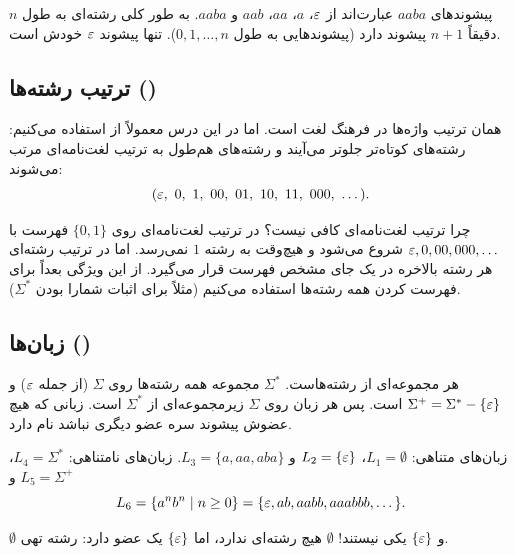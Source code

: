 \begin{example}
پیشوندهای $aaba$ عبارت‌اند از $\varepsilon$، $a$، $aa$، $aab$ و $aaba$. به طور کلی رشته‌ای به طول $n$ دقیقاً $n+1$ پیشوند دارد (پیشوندهایی به طول $0,1,\dots,n$). تنها پیشوند $\varepsilon$ خودش است.
\end{example}

\subsection{ترتیب رشته‌ها ()}
 همان ترتیب واژه‌ها در فرهنگ لغت است. اما در این درس معمولاً از  استفاده می‌کنیم: رشته‌های کوتاه‌تر جلوتر می‌آیند و رشته‌های هم‌طول به ترتیب لغت‌نامه‌ای مرتب می‌شوند:
\[(\eps,\ 0,\ 1,\ 00,\ 01,\ 10,\ 11,\ 000,\ \dots).\]

\begin{note}
چرا ترتیب لغت‌نامه‌ای کافی نیست؟ در ترتیب لغت‌نامه‌ای روی $\{0,1\}$ فهرست با $\varepsilon,0,00,000,\dots$ شروع می‌شود و هیچ‌وقت به رشته $1$ نمی‌رسد. اما در ترتیب رشته‌ای هر رشته بالاخره در یک جای مشخص فهرست قرار می‌گیرد. از این ویژگی بعداً برای فهرست کردن همه رشته‌ها استفاده می‌کنیم (مثلاً برای اثبات شمارا بودن $\Sigma^*$).
\end{note}

\subsection{زبان‌ها ()}

\begin{definition}[زبان]
 هر مجموعه‌ای از رشته‌هاست. $\Sigma^*$ مجموعه همه رشته‌ها روی $\Sigma$ (از جمله $\varepsilon$) و $\Sigma^+=\Sigma^*-\{\varepsilon\}$ است. پس هر زبان روی $\Sigma$ زیرمجموعه‌ای از $\Sigma^*$ است. زبانی که هیچ عضوش پیشوند سره عضو دیگری نباشد  نام دارد.
\end{definition}

\begin{example}
زبان‌های متناهی: $L_1=\emptyset$، $L_2=\{\varepsilon\}$ و $L_3=\{a,aa,aba\}$. زبان‌های نامتناهی: $L_4=\Sigma^*$، $L_5=\Sigma^+$ و
\[L_6=\{a^nb^n\mid n\ge0\}=\{\varepsilon,ab,aabb,aaabbb,\dots\}.\]
\end{example}

\begin{warning}
$\emptyset$ و $\{\varepsilon\}$ یکی نیستند! $\emptyset$ هیچ رشته‌ای ندارد، اما $\{\varepsilon\}$ یک عضو دارد: رشته تهی.
\end{warning}

